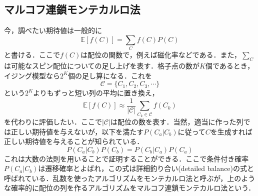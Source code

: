 \documentclass[a4paper,11pt]{jsreport}
\begin{document}
\subsection{マルコフ連鎖モンテカルロ法}
今，調べたい期待値は一般的に
\begin{equation}
  \mathbb{E}[f(C)] = \sum_{C} f(C)P(C)
\end{equation}
と書ける．ここで$f(C)$は配位の関数で，例えば磁化率などである．また，$\sum_{C}$は可能なスピン配位についての足し上げを表す．格子点の数が$K$個であるとき，イジング模型なら$2^K$個の足し算になる．これを
\begin{equation}
  \mathcal{C} = \{ C_1, C_2, C_3, \cdots \}
\end{equation}
という$2^K$よりもずっと短い列の平均に置き換え，
\begin{equation}
  \mathbb{E}[f(C)] \approx \frac{1}{|\mathcal{C|}}\sum_{C_k \in \mathcal{C}}f(C_k)
\end{equation}
を代わりに評価したい．ここで$|\mathcal{C}|$は配位の数を表す．当然，適当に作った列では正しい期待値を与えないが，以下を満たす$P(C_a|C_b)$に従って$C$を生成すれば正しい期待値を与えることが知られている．
\begin{equation}
  P(C_a|C_b)P(C_b) = P(C_b|C_a)P(C_a)
\end{equation}
これは大数の法則を用いることで証明することができる．ここで条件付き確率$P(C_a|C_b)$は遷移確率とよばれ，この式は詳細釣り合い(detailed balance)の式と呼ばれている．乱数を使ったアルゴリズムをモンテカルロ法と呼ぶが，上のような確率的に配位の列を作るアルゴリズムをマルコフ連鎖モンテカルロ法という．\par
\end{document}

